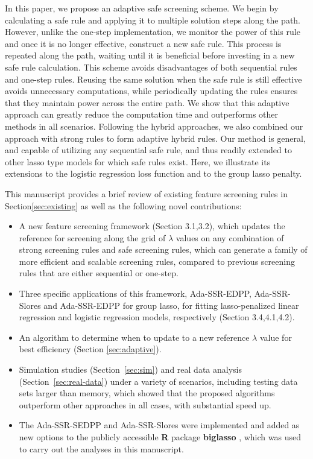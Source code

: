 In this paper, we propose an adaptive safe screening scheme. We begin by calculating a safe rule and applying it to multiple solution steps along the path.  However, unlike the one-step implementation, we monitor the power of this rule and once it is no longer effective, construct a new safe rule.  This process is repeated along the path, waiting until it is beneficial before investing in a new safe rule calculation. This scheme avoids disadvantages of both sequential rules and one-step rules. Reusing the same solution when the safe rule is still effective avoids unnecessary computations, while periodically updating the rules ensures that they maintain power across the entire path. We show that this adaptive approach can greatly reduce the computation time and outperforms other methods in all scenarios. Following the hybrid approaches, we also combined our approach with strong rules to form adaptive hybrid rules. Our method is general, and capable of utilizing any sequential safe rule, and thus readily extended to other lasso type models for which safe rules exist. Here, we illustrate its extensions to the logistic regression loss function and to the group lasso penalty.

This manuscript provides a brief review of existing feature screening rules in Section\ref{sec:existing} as well as the following novel contributions:

\begin{itemize}
    \item A new feature screening framework (Section 3.1,3.2), which updates the reference for screening along the grid of $\lambda$ values on any combination of strong screening rules and safe screening rules, which can generate a family of more efficient and scalable screening rules, compared to previous screening rules that are either sequential or one-step.
    \item Three specific applications of this framework, Ada-SSR-EDPP, Ada-SSR-Slores and Ada-SSR-EDPP for group lasso, for fitting lasso-penalized linear regression and logistic regression models, respectively (Section 3.4,4.1,4.2).
    \item An algorithm to determine when to update to a new reference $\lambda$ value for best efficiency (Section \ref{sec:adaptive}).
    \item Simulation studies (Section~\ref{sec:sim}) and real data analysis (Section~\ref{sec:real-data}) under a variety of scenarios, including testing data sets larger than memory, which showed that the proposed algorithms outperform other approaches in all cases, with substantial speed up.
    \item The Ada-SSR-SEDPP and Ada-SSR-Slores were implemented and added as new options to the publicly accessible \textbf{R} package \textbf{biglasso} \citep{zeng2017biglasso}, which was used to carry out the analyses in this manuscript.
\end{itemize}

